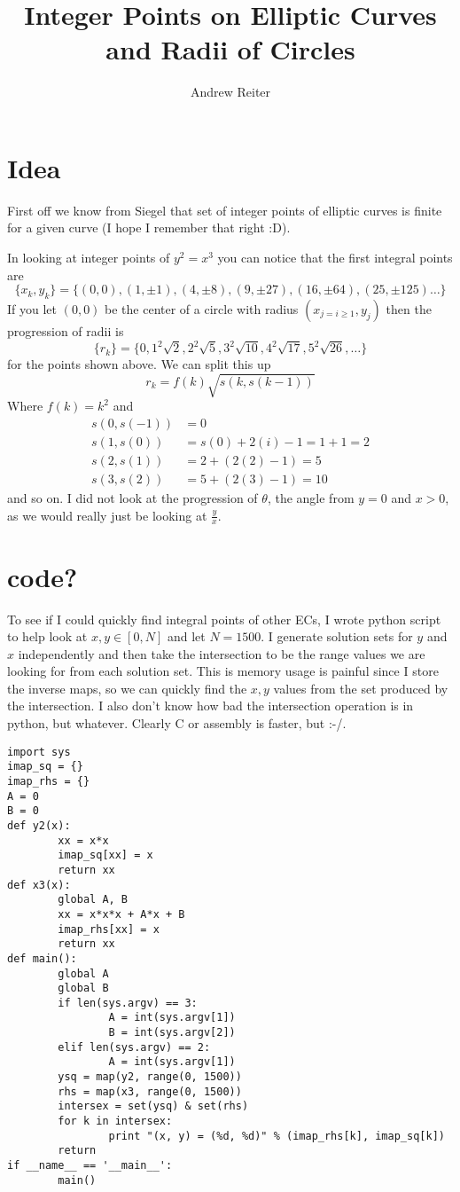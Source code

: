 \documentclass[11pt]{amsart}
\title{Integer Points on Elliptic Curves and Radii of Circles}
\author{Andrew Reiter}
\begin{document}
\maketitle

\section{Idea}
First off we know from Siegel that set of integer points of elliptic curves is finite for a given curve (I hope I remember that right :D).

In looking at integer points of $y^2 = x^3$ you can notice that the first integral points are 
\[
	\{x_k, y_k \} = \{ (0,0), (1, \pm 1), (4, \pm 8), (9, \pm 27), (16, \pm 64), (25, \pm 125)\ldots \}
\]
If you let $(0,0)$ be the center of a circle with radius $(x_{j = i\ge1}, y_{j})$ then the progression
of radii is 
\[
	\{ r_k \} = \{ 0, 1^2 \sqrt{2}, 2^2 \sqrt{5}, 3^2 \sqrt{10}, 4^2 \sqrt{17}, 5^2 \sqrt{26}, \ldots \}
\]
for the points shown above. We can split this up
\[
	r_k = f(k) \sqrt{s(k, s(k-1))}
\]
Where $f(k) = k^2$ and 
\begin{align*}
	s(0, s(-1)) &= 0 \\
	s(1, s(0)) &= s(0) + 2(i) - 1 = 1 + 1 = 2 \\
	s(2, s(1)) &= 2 + (2(2)-1) = 5\\
	s(3, s(2)) &= 5 + (2(3) - 1) = 10
\end{align*}
and so on.
I did not look at the progression of $\theta$, the angle from $y = 0$ and $x > 0$, as we would really just be looking at $\frac{y}{x}$.


\section{code? }
To see if I could quickly find integral points of other ECs, I wrote python script to help look at $x,y \in [0,N]$ and let $N = 1500$. I
generate solution sets for $y$ and $x$ independently and then take the intersection to be the range values we are looking for
from each solution set. This is memory usage is painful since I store the inverse maps, so we can quickly find the $x,y$ values
from the set produced by the intersection. I also don't know how bad the intersection operation is in python, but whatever. Clearly C
or assembly is faster, but :-/.

\begin{lstlisting}
import sys
imap_sq = {}
imap_rhs = {}
A = 0
B = 0
def y2(x):
        xx = x*x
        imap_sq[xx] = x
        return xx
def x3(x):
        global A, B
        xx = x*x*x + A*x + B
        imap_rhs[xx] = x
        return xx
def main():
        global A
        global B
        if len(sys.argv) == 3:
                A = int(sys.argv[1])
                B = int(sys.argv[2]) 
        elif len(sys.argv) == 2:
                A = int(sys.argv[1])
        ysq = map(y2, range(0, 1500))
        rhs = map(x3, range(0, 1500))
        intersex = set(ysq) & set(rhs)
        for k in intersex:
                print "(x, y) = (%d, %d)" % (imap_rhs[k], imap_sq[k])
        return
if __name__ == '__main__':
        main()

\end{lstlisting}
\end{document}
